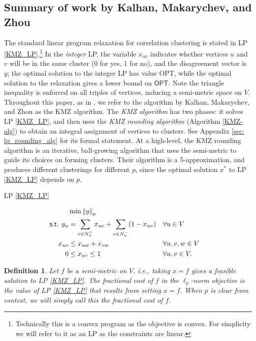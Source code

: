 \documentclass[11pt]{article}
\newtheorem{definition}{Definition}
\begin{document}
\subsection{Summary of work by Kalhan, Makarychev, and Zhou}
The standard linear program relaxation for correlation clustering 
is stated in LP \ref{KMZ_LP}.\footnote{Technically this is a convex program as the objective is convex. For simplicity we will refer to it as an LP as the constraints are linear.}
In the \textit{integer} LP, the variable $x_{uv}$ indicates whether vertices $u$ and $v$ will be in the same cluster (0 for yes, 1 for no), and the disagreement vector is $y$; the optimal solution to the integer LP has value \textsf{OPT}, while the optimal solution to the relaxation gives a lower bound on $\textsf{OPT}$. 
Note the triangle inequality is enforced on all triples of vertices, inducing a semi-metric space on $V$.
Throughout this paper, as in \cite{DMN23}, we refer to the algorithm by Kalhan, Makarychev, and Zhou as the KMZ algorithm. 
The \emph{KMZ algorithm} has two phases: it solves LP \ref{KMZ_LP}, 
and then uses the \textit{KMZ rounding algorithm} (Algorithm \ref{KMZ-alg}) to obtain an integral assignment of vertices to clusters. 
See Appendix \ref{sec: lp_rounding_alg} for its formal statement.
At a high-level, the KMZ rounding algorithm is an iterative, ball-growing algorithm
that uses the semi-metric to guide its choices on forming clusters.
Their algorithm is a 5-approximation, and produces different clusterings for different $p$, since the optimal solution $x^*$ to LP \ref{KMZ_LP} depends on $p$.



\vspace{-1cm}
\begin{flushleft}
\begin{equation*}\label{KMZ_LP}
\end{equation*}
LP \ref{KMZ_LP}
\end{flushleft}
\vspace{-1cm}
\begin{align}
     &\min {\lVert y \rVert}_p \notag\\
    \textsf{s.t. } y_u &= \sum_{v \in N_u^+} x_{uv} + \sum_{v \in N_u^-} (1-x_{uv})  && \forall u \in V \notag\\
     x_{uv}&\leq x_{uw}+x_{vw}  &&\forall u,v,w \in V \notag\\
     0 &\leq x_{uv} \leq 1  &&\forall u,v \in V. \notag
\end{align}

\begin{definition} \label{def: frac_cost}
    Let $f$ be a semi-metric on $V$, i.e., taking $x=f$ gives a feasible solution to LP \ref{KMZ_LP}. The \emph{fractional cost of $f$ in the $\ell_p$-norm objective} is the value of LP \ref{KMZ_LP} that results from setting $x=f$. When $p$ is clear from context, we will simply call this the fractional cost of $f$. 
\end{definition}
\end{document}
